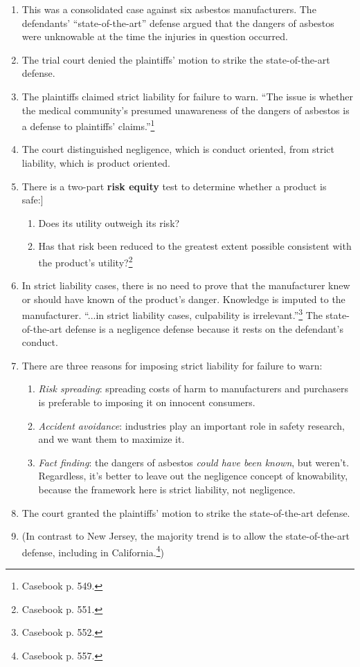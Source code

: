 \begin{enumerate}
    \item This was a consolidated case against six asbestos manufacturers. The 
    defendants' ``state-of-the-art'' defense argued that the dangers of asbestos 
    were unknowable at the time the injuries in question occurred.
    \item The trial court denied the plaintiffs' motion to strike the 
    state-of-the-art defense.
    \item The plaintiffs claimed strict liability for failure to warn. ``The 
    issue is whether the medical community's presumed unawareness of the dangers 
    of asbestos is a defense to plaintiffs' claims.''\footnote{Casebook p. 549.}
    \item The court distinguished negligence, which is conduct oriented, from 
    strict liability, which is product oriented.
    \item There is a two-part \textbf{risk equity} test to determine whether a 
    product is safe:]\
    \begin{enumerate}
        \item Does its utility outweigh its risk?
        \item Has that risk been reduced to the greatest extent possible 
        consistent with the product's utility?\footnote{Casebook p. 551.}
    \end{enumerate}
    \item In strict liability cases, there is no need to prove that the 
    manufacturer knew or should have known of the product's danger. Knowledge is 
    imputed to the manufacturer. ``...in strict liability cases, culpability is 
    irrelevant.''\footnote{Casebook p. 552.} The state-of-the-art defense is a 
    negligence defense because it rests on the defendant's conduct.
    \item There are three reasons for imposing strict liability for failure to 
    warn:
    \begin{enumerate}
        \item \emph{Risk spreading}: spreading costs of harm to manufacturers 
        and purchasers is preferable to imposing it on innocent consumers.
        \item \emph{Accident avoidance}: industries play an important role in 
        safety research, and we want them to maximize it.
        \item \emph{Fact finding}: the dangers of asbestos \emph{could have been 
        known}, but weren't. Regardless, it's better to leave out the negligence 
        concept of knowability, because the framework here is strict liability, 
        not negligence.
    \end{enumerate}
    \item The court granted the plaintiffs' motion to strike the 
    state-of-the-art defense.
    \item (In contrast to New Jersey, the majority trend is to allow the 
    state-of-the-art defense, including in California.\footnote{Casebook p.  
    557.})
\end{enumerate}

